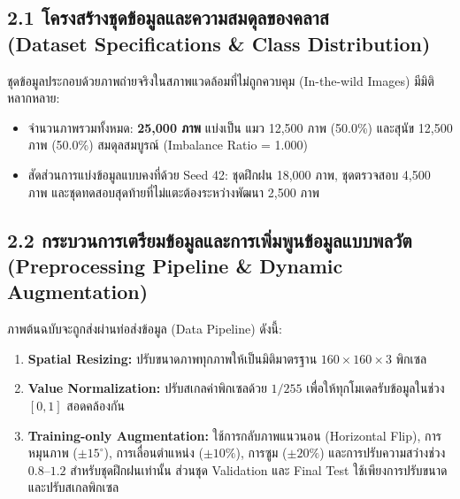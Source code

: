 \documentclass[12pt,a4paper]{article}
\begin{document}
\subsection*{2.1 โครงสร้างชุดข้อมูลและความสมดุลของคลาส\\ \normalsize(Dataset Specifications \& Class Distribution)}
ชุดข้อมูลประกอบด้วยภาพถ่ายจริงในสภาพแวดล้อมที่ไม่ถูกควบคุม (In-the-wild Images) มีมิติหลากหลาย:
\begin{itemize}[leftmargin=1.8em, itemsep=0pt, topsep=1pt, parsep=0pt]
\item จำนวนภาพรวมทั้งหมด: \textbf{25,000 ภาพ} แบ่งเป็น แมว 12,500 ภาพ (50.0\%) และสุนัข 12,500 ภาพ (50.0\%) สมดุลสมบูรณ์ (Imbalance Ratio = 1.000)
\item สัดส่วนการแบ่งข้อมูลแบบคงที่ด้วย Seed 42: ชุดฝึกฝน 18,000 ภาพ, ชุดตรวจสอบ 4,500 ภาพ และชุดทดสอบสุดท้ายที่ไม่แตะต้องระหว่างพัฒนา 2,500 ภาพ
\end{itemize}

\subsection*{2.2 กระบวนการเตรียมข้อมูลและการเพิ่มพูนข้อมูลแบบพลวัต\\ \normalsize(Preprocessing Pipeline \& Dynamic Augmentation)}
ภาพต้นฉบับจะถูกส่งผ่านท่อส่งข้อมูล (Data Pipeline) ดังนี้:
\begin{enumerate}[leftmargin=1.8em, itemsep=0pt, topsep=1pt, parsep=0pt]
\item \textbf{Spatial Resizing:} ปรับขนาดภาพทุกภาพให้เป็นมิติมาตรฐาน $160 \times 160 \times 3$ พิกเซล
\item \textbf{Value Normalization:} ปรับสเกลค่าพิกเซลด้วย $1/255$ เพื่อให้ทุกโมเดลรับข้อมูลในช่วง $[0,1]$ สอดคล้องกัน
\item \textbf{Training-only Augmentation:} ใช้การกลับภาพแนวนอน (Horizontal Flip), การหมุนภาพ ($\pm 15^\circ$), การเลื่อนตำแหน่ง ($\pm 10\%$), การซูม ($\pm 20\%$) และการปรับความสว่างช่วง $0.8$--$1.2$ สำหรับชุดฝึกฝนเท่านั้น ส่วนชุด Validation และ Final Test ใช้เพียงการปรับขนาดและปรับสเกลพิกเซล
\end{enumerate}
\end{document}
